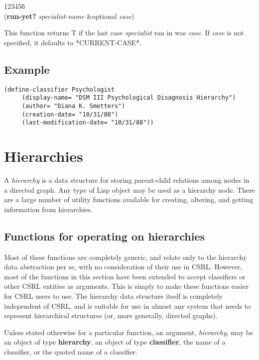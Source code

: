 \begin{tabbing}
123456\= \kill
\\
({\bf run-yet?} {\it specialist-name\/} \&optional {\it case\/}) 
\end{tabbing}
This function returns T if the last case {\it specialist} ran in was
{\it case\/}. If {\it case} is not specified, it defaults to
*CURRENT-CASE*.

\section{Example}

\begin{verbatim}
(define-classifier Psychologist
     (display-name= "DSM III Psychological Disagnosis Hierarchy")
     (author= "Diana K. Smetters")
     (creation-date= "10/31/88")
     (last-modification-date= "10/31/88"))
\end{verbatim}


\chapter{Hierarchies\label{hierarchies}}

A {\it hierarchy} is a data structure for storing parent-child
relations among nodes in a directed graph. Any type of Lisp object may
be used as a hierarchy node. There are a large number of utility
functions available for creating, altering, and getting information
from hierarchies. 

\section{Functions for operating on hierarchies}

Most of these functions are completely generic, and relate only to the
hierarchy data abstraction per se, with no consideration of their use
in CSRL.  However, most of the functions in this section have been
extended to accept classifiers or other CSRL entities as arguments.
This is simply to make these functions easier for CSRL users to use.
The hierarchy data structure itself is completely independent of CSRL,
and is suitable for use in almost any system that needs to represent
hierarchical structures (or, more generally, directed graphs).

Unless stated otherwise for a particular function, an argument, {\it
hierarchy\/}, may be an object of type {\bf hierarchy}, an object of
type {\bf classifier}, the name of a classifier, or the quoted name of
a classifier. 

